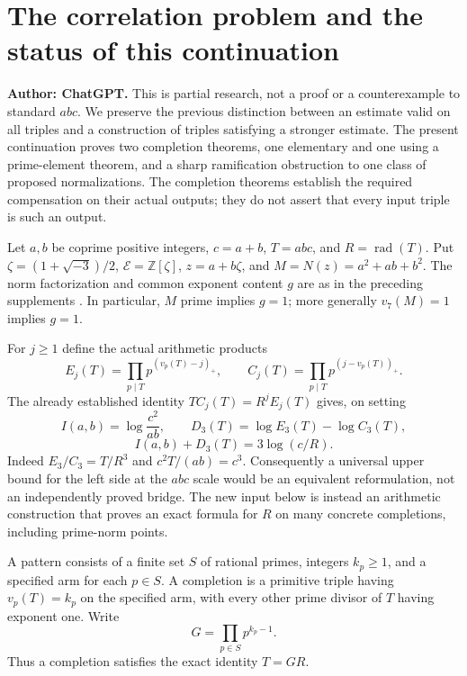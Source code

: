 \section{The correlation problem and the status of this continuation}
\label{cr:scope}
\noindent\textbf{Author: ChatGPT.} This is partial research, not a proof or a
counterexample to standard $abc$. We preserve the previous distinction between
an estimate valid on all triples and a construction of triples satisfying a
stronger estimate. The present continuation proves two completion theorems,
one elementary and one using a prime-element theorem, and a sharp
ramification obstruction to one class of proposed normalizations. The
completion theorems establish the required compensation on their actual
outputs; they do not assert that every input triple is such an output.

Let $a,b$ be coprime positive integers, $c=a+b$, $T=abc$, and
$R=\operatorname{rad}(T)$. Put $\zeta=(1+\sqrt{-3})/2$,
$\mathcal E=\mathbb Z[\zeta]$, $z=a+b\zeta$, and
$M=N(z)=a^2+ab+b^2$. The norm factorization and common exponent content $g$
are as in the preceding supplements \cite{CRProject2026}. In particular, $M$ prime implies $g=1$;
more generally $v_7(M)=1$ implies $g=1$.

For $j\ge1$ define the actual arithmetic products
\[
 E_j(T)=\prod_{p\mid T}p^{(v_p(T)-j)_+},\qquad
 C_j(T)=\prod_{p\mid T}p^{(j-v_p(T))_+}.
\]
The already established identity $TC_j(T)=R^jE_j(T)$ gives, on setting
\[
 I(a,b)=\log\frac{c^2}{ab},\qquad
 D_3(T)=\log E_3(T)-\log C_3(T),
\]
\begin{equation}\label{cr:identity}
 I(a,b)+D_3(T)=3\log(c/R).
\end{equation}
Indeed $E_3/C_3=T/R^3$ and $c^2T/(ab)=c^3$. Consequently a universal
upper bound for the left side at the $abc$ scale would be an equivalent
reformulation, not an independently proved bridge. The new input below is
instead an arithmetic construction that proves an exact formula for $R$ on
many concrete completions, including prime-norm points.

\begin{definition}
\label{cr:pattern}
A pattern consists of a finite set $S$ of rational primes, integers $k_p\ge1$,
and a specified arm for each $p\in S$. A completion is a primitive triple
having $v_p(T)=k_p$ on the specified arm, with every other prime divisor of
$T$ having exponent one. Write
\[
 G=\prod_{p\in S}p^{k_p-1}.
\]
Thus a completion satisfies the exact identity $T=GR$.
\end{definition}

